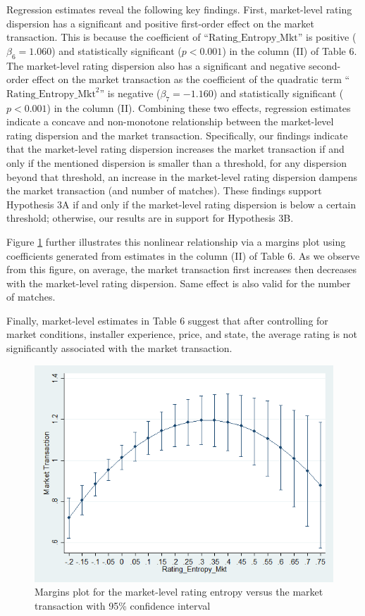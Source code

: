 \documentclass[mnsc,blindrev]{informs3}
\begin{document}
	
	
	
	
	Regression estimates reveal the following key findings. First, market-level rating dispersion has a significant and positive first-order effect on the market transaction. This is because the coefficient of ``$\text{Rating\_Entropy\_Mkt}$'' is positive ($\beta_{6}=1.060$) and statistically significant ($p<0.001$) in the column (II) of Table 6. The market-level rating dispersion also has a significant and negative second-order effect on the market transaction as the coefficient of the quadratic term ``$\text{Rating\_Entropy\_Mkt}^2$'' is negative ($\beta_{7}=-1.160$) and statistically significant ($p<0.001$) in the column (II). Combining these two effects, regression estimates indicate a concave and non-monotone relationship between the market-level rating dispersion and the market transaction.  Specifically, our findings indicate that the market-level rating dispersion increases the market transaction if and only if the mentioned dispersion is smaller than a threshold, for any dispersion beyond that threshold, an increase in the market-level rating dispersion dampens the market transaction (and number of matches). These findings support Hypothesis 3A if and only if the market-level rating dispersion is below a certain threshold; otherwise, our results are in support for Hypothesis 3B.
	
	Figure \ref{fig: marginsplot_mkt_entmkt} further illustrates this nonlinear relationship via a margins plot using coefficients generated from estimates in the column (II) of Table 6. As we observe from this figure, on average, the market transaction first increases then decreases with the market-level rating dispersion. Same effect is also valid for the number of matches.
	
	Finally, market-level estimates in Table 6 suggest that after controlling for market conditions, installer experience, price, and state, the average rating is not significantly associated with the market transaction.
	\begin{figure}
		\centering
		\includegraphics[width=0.7\linewidth]{marginsplot_entmkt.png}
		\caption{Margins plot for the market-level rating entropy versus the market transaction with 95\% confidence interval}
		\label{fig: marginsplot_mkt_entmkt}
	\end{figure}
	
\end{document}
